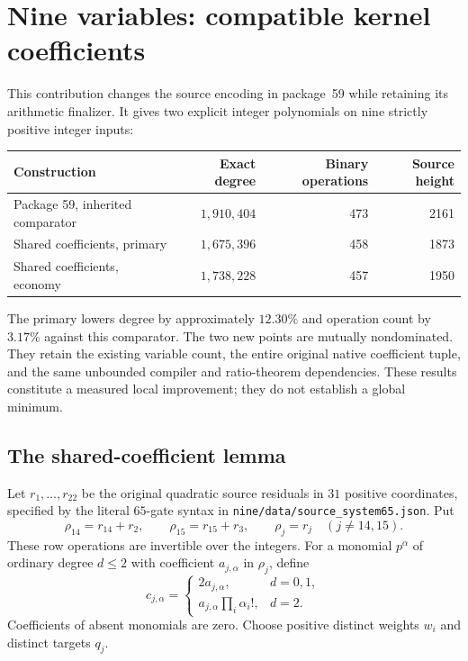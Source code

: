 \section{Nine variables: compatible kernel coefficients}
\label{sec:shared-taps}

This contribution changes the source encoding in package~59 while
retaining its arithmetic finalizer. It gives two explicit integer
polynomials on nine strictly positive integer inputs:
\begin{center}
\begin{tabular}{lrrr}
\toprule
Construction & Exact degree & Binary operations & Source height\\
\midrule
Package 59, inherited comparator & $1{,}910{,}404$ &473&2161\\
Shared coefficients, primary & $1{,}675{,}396$ &458&1873\\
Shared coefficients, economy & $1{,}738{,}228$ &457&1950\\
\bottomrule
\end{tabular}
\end{center}
The primary lowers degree by approximately $12.30\%$ and operation count
by $3.17\%$ against this comparator. The two new points are mutually
nondominated. They retain the existing variable count, the entire original
native coefficient tuple, and the same unbounded compiler and ratio-theorem
dependencies. These results constitute a measured local improvement; they
do not establish a global minimum.

\subsection{The shared-coefficient lemma}

Let $r_1,\ldots,r_{22}$ be the original quadratic source residuals in
$31$ positive coordinates, specified by the literal $65$-gate syntax in
\texttt{nine/data/source\_system65.json}. Put
\[
 \rho_{14}=r_{14}+r_2,\qquad \rho_{15}=r_{15}+r_3,
 \qquad \rho_j=r_j\quad(j\ne14,15).
\]
These row operations are invertible over the integers. For a monomial
$p^\alpha$ of ordinary degree $d\le2$ with coefficient $a_{j,\alpha}$ in
$\rho_j$, define
\[
 c_{j,\alpha}=\begin{cases}
 2a_{j,\alpha},&d=0,1,\\
 a_{j,\alpha}\prod_i\alpha_i!,&d=2.
 \end{cases}
\]
Coefficients of absent monomials are zero. Choose positive distinct
weights $w_i$ and distinct targets $q_j$.

